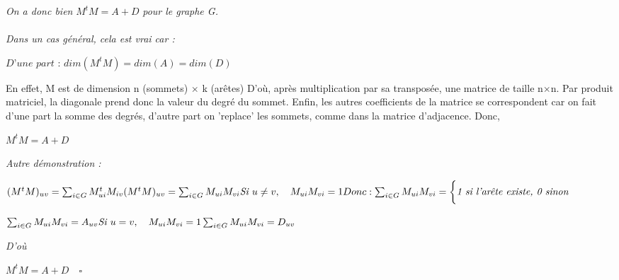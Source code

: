 \documentclass{article}
\begin{document}
	\textit{On a donc bien }$ M^tM = A+D $\textit{ pour le graphe G.}\\\\
	\textit{Dans un cas général, cela est vrai car :}
\begin{center}
	$
	\textit{D'une part : }dim(M^tM) = dim(A) = dim(D)
	$
\end{center}
	\textsf{En effet, M est de dimension n (sommets)} $\times$ \textsf{k (arêtes)}
	\linebreak
	\textsf{D'où, après multiplication par sa transposée, une matrice de taille n}$\times$\textsf{n.}
	\linebreak
	\textsf{Par produit matriciel, la diagonale prend donc la valeur du degré du sommet.}
	\linebreak
	\textsf{Enfin, les autres coefficients de la matrice se correspondent car on fait d'une part la somme des degrés, d'autre part on 'replace' les sommets, comme dans la matrice d'adjacence.}
	\linebreak
	\textsf{Donc,}
	\linebreak
\begin{center}
	$
	M^tM = A + D
	$
\end{center}
\textit{Autre démonstration :}
\begin{center}
	$
	(M^tM)_{uv} = \sum_{i \in G} M_{ui}^tM_{iv}
	\linebreak
	(M^tM)_{uv}	= \sum_{i \in G} M_{ui}M_{vi}
	\linebreak
	\textit{Si } u \neq v,
	\quad
	M_{ui}M_{vi} = 1
	\linebreak
	Donc :
	\linebreak
	\sum_{i \in G} M_{ui}M_{vi} = \bigg\{ \textit{1 si l'arête existe, 0 sinon}
	$
\end{center}
\begin{center}
	$
	\sum_{i \in G} M_{ui}M_{vi} = A_{uv}
	\linebreak
	\textit{Si } u = v,
	\quad
	M_{ui}M_{vi} = 1
	\linebreak
	\sum_{i \in G} M_{ui}M_{vi} = D_{uv}
	$
\end{center}
\textit{D'où}
\begin{center}
	$
	M^tM = A+D
	\quad
	\square
	$
\end{center}
\end{document}
